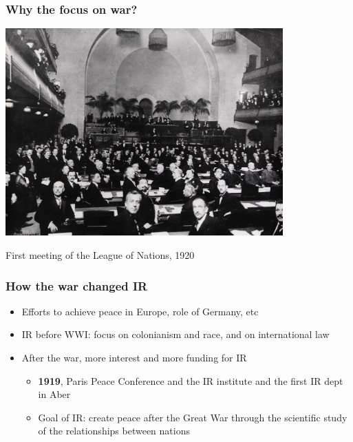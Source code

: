 \documentclass[aspectratio=43]{beamer}
\begin{document}


\begin{frame}
\frametitle{Why the focus on war?}
\centering

\includegraphics[width = 0.8\textwidth]{img/league_of_nations}

First meeting of the League of Nations, 1920

\end{frame}

\begin{frame}
\frametitle{How the war changed IR}
\centering

\begin{itemize}
  \item Efforts to achieve peace in Europe, role of Germany, etc
  \item IR before WWI: focus on colonianism and race, and on international law
  \item After the war, more interest and more funding for IR
  \begin{itemize}
    \item \textbf{1919}, Paris Peace Conference and the IR institute and the first IR dept in Aber
    \item Goal of IR: create peace after the Great War through the scientific study of the relationships between nations
  \end{itemize}
\end{itemize}

\end{frame}
\end{document}

